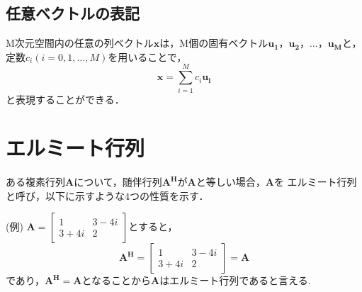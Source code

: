 \subsection{任意ベクトルの表記}
M次元空間内の任意の列ベクトル$\bm{x}$は，M個の固有ベクトル$\bm{u_1}，\bm{u_2}，\ldots，\bm{u_M}$と，
定数$c_i(i=0,1,\ldots,M)$を用いることで，
\begin{equation}
    \bm{x} = \sum_{i=1}^M c_i\bm{u_i}
\end{equation}
と表現することができる．

\section{エルミート行列}
ある複素行列$\bm{A}$について，随伴行列$\bm{A^H}$が$\bm{A}$と等しい場合，$\bm{A}$を
エルミート行列と呼び，以下に示すような4つの性質を示す．

(例) \quad
$
  \bm{A} = \left[
    \begin{array}{cc}
      1 & 3-4i \\
      3+4i & 2
    \end{array}
  \right]
$とすると，
\vspace{1mm}
\begin{equation}
    \bm{A^H} = \left[
        \begin{array}{cc}
            1 & 3-4i \\
            3+4i & 2
        \end{array}
    \right]
    = \bm{A} \nonumber
\end{equation}
であり，$\bm{A^H}=\bm{A}$となることから$\bm{A}$はエルミート行列であると言える.

